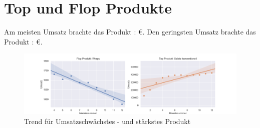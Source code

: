\documentclass[10pt,a4paper]{article}
\begin{document}
\section*{Top und Flop Produkte}
Am meisten Umsatz brachte das Produkt :  \euro. Den geringsten Umsatz brachte das Produkt :  \euro.

\begin{figure}[h]
\centering
    \includegraphics[width=1\textwidth]{img/flopundtop.png}
\caption{Trend für Umsatzschwächstes - und stärkstes Produkt} 
\end{figure}
\end{document}
